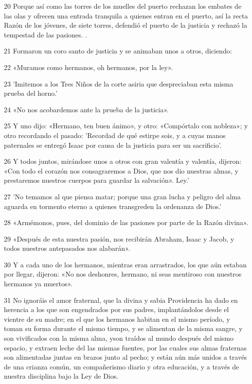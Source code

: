 \par 20 Porque así como las torres de los muelles del puerto rechazan los embates de las olas y ofrecen una entrada tranquila a quienes entran en el puerto, así la recta Razón de los jóvenes, de siete torres, defendió el puerto de la justicia y rechazó la tempestad de las pasiones. .

\par 21 Formaron un coro santo de justicia y se animaban unos a otros, diciendo:

\par 22 «Muramos como hermanos, oh hermanos, por la ley».

\par 23 'Imitemos a los Tres Niños de la corte asiria que despreciaban esta misma prueba del horno.'

\par 24 «No nos acobardemos ante la prueba de la justicia».

\par 25 Y uno dijo: «Hermano, ten buen ánimo», y otro: «Compórtalo con nobleza»; y otro recordando el pasado: 'Recordad de qué estirpe sois, y a cuyas manos paternales se entregó Isaac por causa de la justicia para ser un sacrificio'.

\par 26 Y todos juntos, mirándose unos a otros con gran valentía y valentía, dijeron: «Con todo el corazón nos consagraremos a Dios, que nos dio nuestras almas, y prestaremos nuestros cuerpos para guardar la salvación». Ley.'

\par 27 'No temamos al que piensa matar; porque una gran lucha y peligro del alma aguarda en tormento eterno a quienes transgreden la ordenanza de Dios.'

\par 28 «Armémonos, pues, del dominio de las pasiones por parte de la Razón divina».

\par 29 «Después de esta nuestra pasión, nos recibirán Abraham, Isaac y Jacob, y todos nuestros antepasados ​​nos alabarán».

\par 30 Y a cada uno de los hermanos, mientras eran arrastrados, los que aún estaban por llegar, dijeron: «No nos deshonres, hermano, ni seas mentiroso con nuestros hermanos ya muertos».

\par 31 No ignoráis el amor fraternal, que la divina y sabia Providencia ha dado en herencia a los que son engendrados por sus padres, implantándolos desde el vientre de su madre; en el que los hermanos habitan en el mismo período, y toman su forma durante el mismo tiempo, y se alimentan de la misma sangre, y son vivificados con la misma alma, y ​​son traídos al mundo después del mismo espacio, y extraen leche del las mismas fuentes, por las cuales sus almas fraternas son alimentadas juntas en brazos junto al pecho; y están aún más unidos a través de una crianza común, un compañerismo diario y otra educación, y a través de nuestra disciplina bajo la Ley de Dios.


